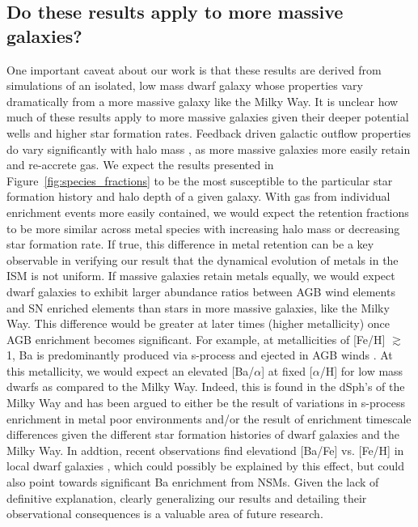 \documentclass[twocolumn]{aastex61}
\begin{document}
\subsection{Do these results apply to more massive galaxies?}
\label{sec:massive galaxies}
One important caveat about our work is that these results are derived from simulations of an isolated, low mass dwarf galaxy whose properties vary dramatically from a more massive galaxy like the Milky Way. It is unclear how much of these results apply to more massive galaxies given their deeper potential wells and higher star formation rates. Feedback driven galactic outflow properties do vary significantly with halo mass \citep[e.g.][]{MacLowFerrara1999,Muratov2017}, as more massive galaxies more easily retain and re-accrete gas. We expect the results presented in Figure~\ref{fig:species_fractions} to be the most susceptible to the particular star formation history and halo depth of a given galaxy. With gas from individual enrichment events more easily contained, we would expect the retention fractions to be more similar across metal species with increasing halo mass or decreasing star formation rate. If true, this difference in metal retention can be a key observable in verifying our result that the dynamical evolution of metals in the ISM is not uniform. If massive galaxies retain metals equally, we would expect dwarf galaxies to exhibit larger abundance ratios between AGB wind elements and SN enriched elements than stars in more massive galaxies, like the Milky Way. This difference would be greater at later times (higher metallicity) once AGB enrichment becomes significant. For example, at metallicities of [Fe/H] $\gtrsim$ 1, Ba is predominantly produced via s-process and ejected in AGB winds \citep{Travaglio1999,Travaglio2004}. At this metallicity, we would expect an elevated [Ba/$\alpha$] at fixed [$\alpha$/H] for low mass dwarfs as compared to the Milky Way. Indeed, this is found in the dSph's of the Milky Way \citep[see ][]{Tolstoy2009} and has been argued to either be the result of variations in s-process enrichment in metal poor environments and/or the result of enrichment timescale differences given the different star formation histories of dwarf galaxies and the Milky Way. In addtion, recent observations find elevationd [Ba/Fe] vs. [Fe/H] in local dwarf galaxies \citep{DugganKirbyAAS},
which could possibly be explained by this effect, but could also point towards significant Ba enrichment from NSMs. Given the lack of definitive explanation, clearly generalizing our results and detailing their observational consequences is a valuable area of future research.
\end{document}
